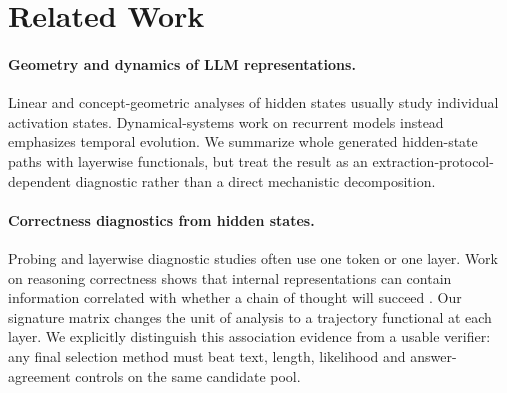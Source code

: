 \section{Related Work}
\label{sec:related}

\paragraph{Geometry and dynamics of LLM representations.}
Linear and concept-geometric analyses of hidden states
\citep{park-linear-2023,geiger-causal-2023,anthropic-superposition-2022} usually
study individual activation states.  Dynamical-systems work on recurrent models
\citep{sussillo-barak-2013} instead emphasizes temporal evolution.  We summarize
whole generated hidden-state paths with layerwise functionals, but treat the
result as an extraction-protocol-dependent diagnostic rather than a direct
mechanistic decomposition.

\paragraph{Correctness diagnostics from hidden states.}
Probing and layerwise diagnostic studies
\citep{belinkov-glass-2019,tenney-etal-2019-bert} often use one token or one
layer.  Work on reasoning correctness shows that internal representations can
contain information correlated with whether a chain of thought will succeed
\citep{afzal-etal-2025-knowing}.  Our signature matrix changes the unit of
analysis to a trajectory functional at each layer.  We explicitly distinguish this association evidence from a usable verifier: any final
selection method must beat text, length, likelihood and answer-agreement
controls on the same candidate pool.

